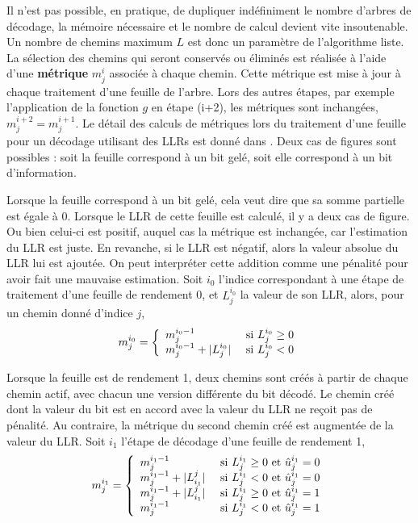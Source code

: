 Il n'est pas possible, en pratique, de dupliquer indéfiniment le nombre d'arbres de décodage, la mémoire nécessaire et le nombre de calcul devient vite insoutenable. Un nombre de chemins maximum $L$ est donc un paramètre de l'algorithme liste. La sélection des chemins qui seront conservés ou éliminés est réalisée à l'aide d'une \textbf{métrique} $m^i_j$ associée à chaque chemin. Cette métrique est mise à jour à chaque traitement d'une feuille de l'arbre. Lors des autres étapes, par exemple l'application de la fonction $g$ en étape (i+2), les métriques sont inchangées, $m^{i+2}_j = m^{i+1}_j$. Le détail des calculs de métriques lors du traitement d'une feuille pour un décodage utilisant des LLRs est donné dans \cite{balatsoukas-stimming_llr-based_2015}. Deux cas de figures sont possibles : soit la feuille correspond à un bit gelé, soit elle correspond à un bit d'information.

Lorsque la feuille correspond à un bit gelé, cela veut dire que sa somme partielle est égale à 0. Lorsque le LLR de cette feuille est calculé, il y a deux cas de figure. Ou bien celui-ci est positif, auquel cas la métrique est inchangée, car l'estimation du LLR est juste. 
En revanche, si le LLR est négatif, alors la valeur absolue du LLR lui est ajoutée. On peut interpréter cette addition comme une \og pénalité \fg pour avoir fait une mauvaise estimation. Soit $i_0$ l'indice correspondant à une étape de traitement d'une feuille de rendement 0, et $L_j^{i_0}$ la valeur de son LLR, alors, pour un chemin donné d'indice $j$, 
\begin{equation*}
m^{i_0}_j=\left\{\begin{array}{l c l} m_j^{{i_0}-1} & \text{ si } L_j^{i_0} \geq 0 \\ m_j^{{i_0}-1} + |L_j^{i_0}| & \text{ si } L_j^{i_0} < 0 \end{array}\right.
\end{equation*}

Lorsque la feuille est de rendement 1, deux chemins sont créés à partir de chaque chemin actif, avec chacun une version différente du bit décodé. Le chemin créé dont la valeur du bit est en accord avec la valeur du LLR ne reçoit pas de pénalité. Au contraire, la métrique du second chemin créé est augmentée de la valeur du LLR. Soit $i_1$ l'étape de décodage d'une feuille de rendement 1,
\begin{equation*}
m^{i_1}_j=\left\{\begin{array}{l c l} m_j^{{i_1}-1}               & \text{ si } L^{i_1}_j \geq 0 \text{ et } \hat{u}^{i_1}_j = 0
                                   \\ m_j^{{i_1}-1} + |L^j_{i_1}| & \text{ si } L^{i_1}_j < 0    \text{ et } \hat{u}^{i_1}_j = 0
                                   \\ m_j^{{i_1}-1} + |L^j_{i_1}| & \text{ si } L^{i_1}_j \geq 0 \text{ et } \hat{u}^{i_1}_j = 1
                                   \\ m_j^{{i_1}-1}               & \text{ si } L^{i_1}_j < 0    \text{ et } \hat{u}^{i_1}_j = 1

                \end{array}\right.
\end{equation*}

